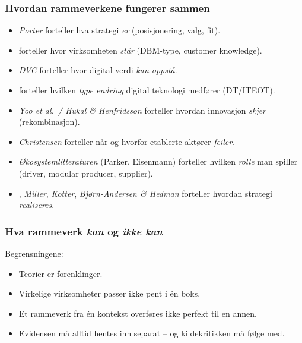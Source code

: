 
\subsubsection*{Hvordan rammeverkene fungerer sammen}
\begin{itemize}
  \item \emph{Porter} forteller hva strategi \emph{er} (posisjonering, valg,
    fit).
  \item {} forteller hvor virksomheten \emph{står}
    (DBM-type, customer knowledge).
  \item \emph{DVC} forteller hvor digital verdi \emph{kan oppstå}.
  \item {} forteller hvilken \emph{type endring} digital
    teknologi medfører (DT/ITEOT).
  \item \emph{Yoo et al.\ / Hukal \& Henfridsson} forteller hvordan
    innovasjon \emph{skjer} (rekombinasjon).
  \item \emph{Christensen} forteller når og hvorfor etablerte aktører
    \emph{feiler}.
  \item \emph{Økosystemlitteraturen} (Parker, Eisenmann) forteller hvilken
    \emph{rolle} man spiller (driver, modular producer, supplier).
  \item {}, \emph{Miller}, \emph{Kotter},
    \emph{Bjørn-Andersen \& Hedman} forteller hvordan strategi
    \emph{realiseres}.
\end{itemize}

\subsubsection*{Hva rammeverk \emph{kan} og \emph{ikke kan}}
Begrensningene:
\begin{itemize}
  \item Teorier er forenklinger.
  \item Virkelige virksomheter passer ikke pent i én boks.
  \item Et rammeverk fra én kontekst overføres ikke perfekt til en annen.
  \item Evidensen må alltid hentes inn separat -- og kildekritikken må
    følge med.
\end{itemize}

